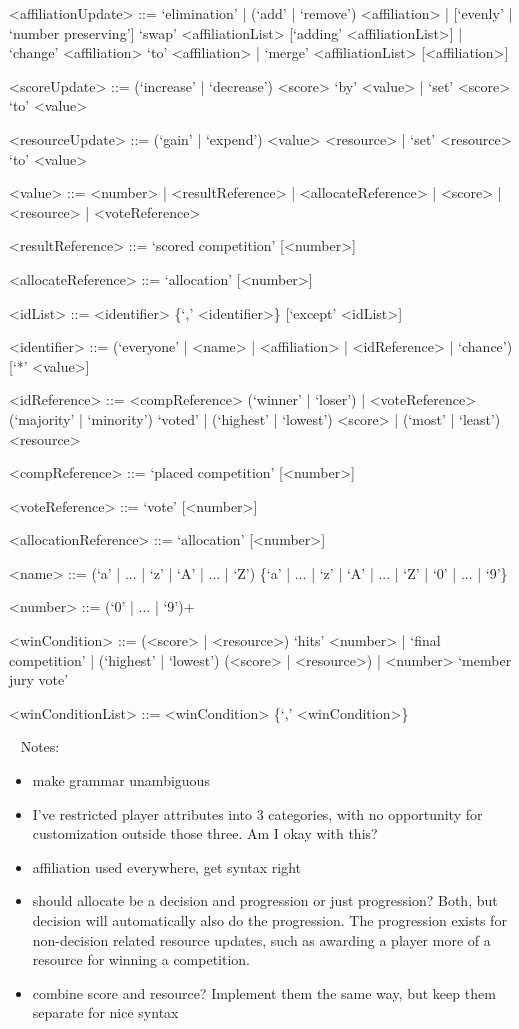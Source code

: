 \documentclass{article}
\begin{document}
\begin{grammar}
<affiliationUpdate> ::= `elimination' | (`add' | `remove') <affiliation> | 
[`evenly' | `number preserving'] `swap' <affiliationList> [`adding' 
<affiliationList>] | `change' <affiliation> `to' <affiliation> | `merge' 
<affiliationList> [<affiliation>]

<scoreUpdate> ::= (`increase' | `decrease') <score> `by' <value> | `set' 
<score> `to' <value> 

<resourceUpdate> ::= (`gain' | `expend') <value> <resource> | `set' 
<resource> `to' <value> 

<value> ::= <number> | <resultReference> | <allocateReference> | <score> | 
<resource> | <voteReference>

<resultReference> ::= `scored competition' [<number>] 

<allocateReference> ::= `allocation' [<number>]

<idList> ::= <identifier> \{`,' <identifier>\} [`except' <idList>]

<identifier> ::= (`everyone' | <name> | <affiliation> | <idReference> | 
`chance') [`*' <value>]

<idReference> ::= <compReference> (`winner' | `loser') | <voteReference> 
(`majority' | `minority') `voted' | (`highest' | `lowest') <score> | (`most' | 
`least') <resource>

<compReference> ::= `placed competition' [<number>]

<voteReference> ::= `vote' [<number>]

<allocationReference> ::= `allocation' [<number>]

<name> ::= (`a' | ... | `z' | `A' | ... | `Z') \{`a' | ... | `z' | `A' | ... | 
`Z' | `0' | ... | `9'\}

<number> ::= (`0' | ... | `9')+

<winCondition> ::= (<score> | <resource>) `hits' <number> | `final competition' 
| (`highest' | `lowest') (<score> | <resource>) | <number> `member jury vote'

<winConditionList> ::= <winCondition> \{`,' <winCondition>\}

\end{grammar}

~\newline
Notes:
\begin{itemize}
	\item make grammar unambiguous
	\item I've restricted player attributes into 3 categories, with no 
	opportunity for customization outside those three. Am I okay with this?
	\item affiliation used everywhere, get syntax right
	\item should allocate be a decision and progression or just progression? 
	Both, but decision will automatically also do the progression. The 
	progression exists for non-decision related resource updates, such as 
	awarding a player more of a resource for winning a competition.
	\item combine score and resource? Implement them the same way, but keep 
	them separate for nice syntax
\end{itemize}
\end{document}

